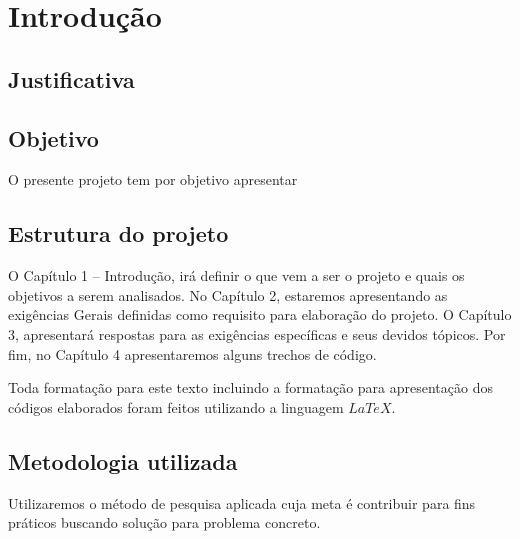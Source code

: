 \chapter{Introdução}

\section{Justificativa}
	
	

\section{Objetivo}

	O presente projeto tem por objetivo apresentar 

\section{Estrutura do projeto} 

	O Capítulo 1 – Introdução, irá definir o que vem a ser o projeto e quais os objetivos a serem analisados. No Capítulo 2, estaremos apresentando as exigências Gerais definidas como requisito para elaboração do projeto. O Capítulo 3, apresentará respostas para as exigências específicas e seus devidos tópicos. Por fim, no Capítulo 4 apresentaremos alguns trechos de código.
		
	Toda formatação para este texto incluindo a formatação para apresentação dos códigos elaborados foram feitos utilizando a linguagem $LaTeX$.


\section{ Metodologia utilizada}
	Utilizaremos o método de pesquisa aplicada cuja meta é contribuir para fins práticos buscando solução para problema concreto.


